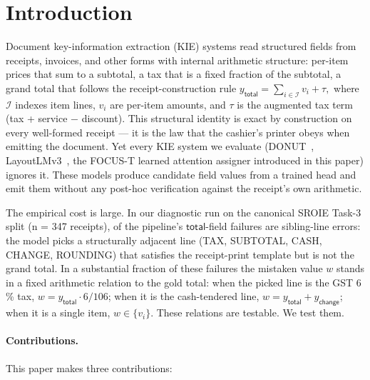 
\section{Introduction}
\label{sec:intro}

Document key-information extraction (KIE) systems read structured
fields from receipts, invoices, and other forms with internal
arithmetic structure: per-item prices that sum to a subtotal, a tax
that is a fixed fraction of the subtotal, a grand total that follows
the receipt-construction rule
\(
y_{\textsf{total}} = \sum_{i \in \mathcal{I}} v_i + \tau,
\)
where $\mathcal{I}$ indexes item lines, $v_i$ are per-item amounts,
and $\tau$ is the augmented tax term (tax + service − discount).
This structural identity is exact by construction on every well-formed
receipt — it is the law that the cashier's printer obeys when emitting
the document.  Yet every KIE system we evaluate
(DONUT~\cite{kim2022donut},
LayoutLMv3~\cite{huang2022layoutlmv3},
the FOCUS-T learned attention assigner introduced in this paper)
ignores it.  These models produce candidate field values from a
trained head and emit them without any post-hoc verification against
the receipt's own arithmetic.

The empirical cost is large.  In our diagnostic run on the canonical
SROIE Task-3 split (n = 347 receipts), 
of the pipeline's $\textsf{total}$-field failures are
sibling-line errors: the model picks a structurally adjacent line
(\textsf{TAX}, \textsf{SUBTOTAL}, \textsf{CASH}, \textsf{CHANGE},
\textsf{ROUNDING}) that satisfies the receipt-print template but is
not the grand total.  In a substantial fraction of these failures the
mistaken value $w$ stands in a fixed arithmetic relation to the gold
total: when the picked line is the GST 6\,\% tax, $w = y_{\textsf{total}} \cdot
6/106$; when it is the cash-tendered line, $w = y_{\textsf{total}} +
y_{\textsf{change}}$; when it is a single item, $w \in \{v_i\}$.  These
relations are testable.  We test them.

\paragraph{Contributions.}  This paper makes three contributions:

